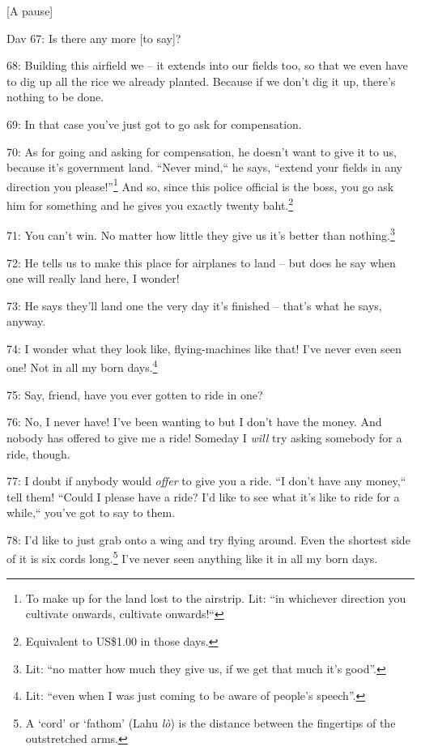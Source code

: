 \begin{center}
[A pause]
\end{center}

\leftskip=0pt
Dav 67: Is there any more [to say]?

68: Building this airfield we -- it extends into our fields too, so that we even
have to dig up all the rice we already planted. Because if we don't dig it up,
there's nothing to be done.

69: In that case you've just got to go ask for compensation.

70: As for going and asking for compensation, he doesn't want to give it to us,
because it's government land. ``Never mind,`` he says, ``extend
your fields in any direction you please!''\footnote{To make up for the land lost to the airstrip. Lit: ``in whichever direction you cultivate onwards, cultivate onwards!``} And so, since this police official
is the boss, you go ask him for something and he gives you exactly twenty baht.\footnote{Equivalent to US\$1.00 in those days.}

71: You can't win. No matter how little they give us it's better than nothing.\footnote{Lit: ``no matter how much they give us, if we get that much it's good''.}

72: He tells us to make this place for airplanes to land -- but does he say when
one will really land here, I wonder!

73: He says they'll land one the very day it's finished -- that's what he says,
anyway.

74: I wonder what they look like, flying-machines like that! I've never even seen
one! Not in all my born days.\footnote{Lit: ``even when I was just coming to be aware of people's speech''.}

75: Say, friend, have you ever gotten to ride in one?

76: No, I never have! I've been wanting to but I don't have the money. And nobody
has offered to give me a ride! Someday I \textit{will} try asking somebody for
a ride, though.

77: I doubt if anybody would \textit{offer} to give you a ride. ``I don't
have any money,`` tell them! ``Could I please have a ride? I'd
like to see what it's like to ride for a while,`` you've got to say to
them.

78: I'd like to just grab onto a wing and try flying around. Even the shortest
side of it is six cords long.\footnote{A `cord' or `fathom' (Lahu \textit{lò}) is the distance between the fingertips of the outstretched arms.} I've never seen anything like it in all my born
days.

